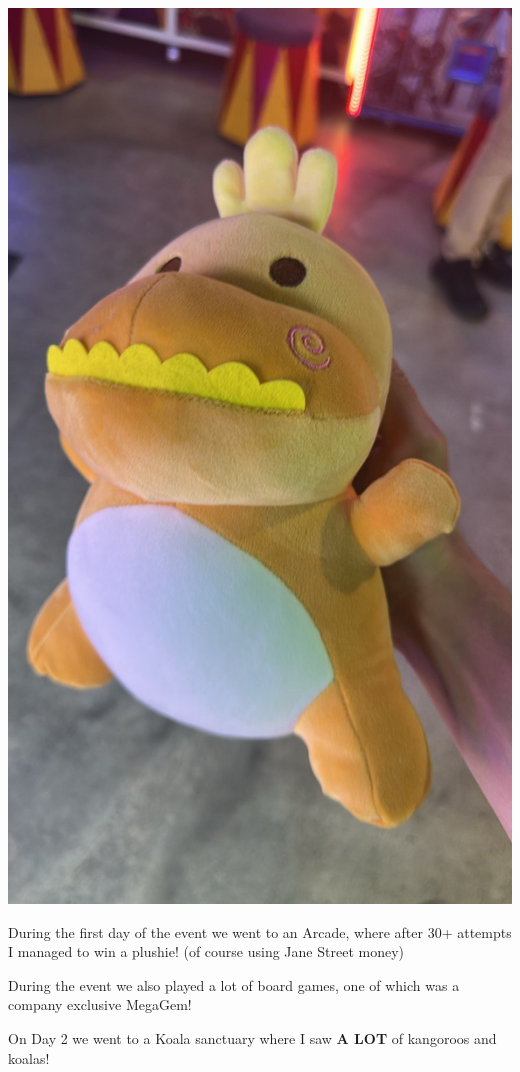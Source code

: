 \documentclass{article}
\begin{document}
\begin{center}
    \includegraphics[scale=0.13]{assets/plushie.jpg}
\end{center}

During the first day of the event we went to an Arcade, where after 30+ attempts I managed to win a plushie! (of course using Jane Street money)

During the event we also played a lot of board games, one of which was a company exclusive MegaGem!

On Day 2 we went to a Koala sanctuary where I saw \textbf{A LOT} of kangoroos and koalas!
\end{document}
